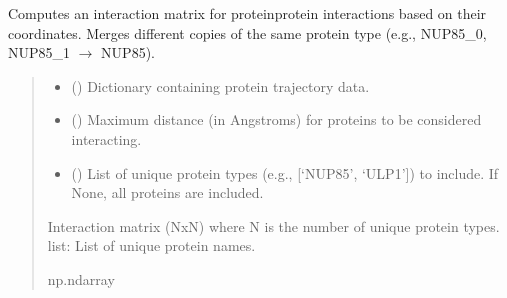 \documentclass[letterpaper,10pt,english]{sphinxmanual}
\begin{document}
\begin{fulllineitems}
\begin{fulllineitems}
\end{fulllineitems}


\begin{fulllineitems}
\label{\detokenize{src:src.Analysis_Class.Analysis.calculate_interaction_matrix}}
\pysigstartsignatures
{}
\pysigstopsignatures
\sphinxAtStartPar
Computes an interaction matrix for protein\sphinxhyphen{}protein interactions based on their coordinates.
Merges different copies of the same protein type (e.g., NUP85\_0, NUP85\_1 \(\rightarrow\) NUP85).
\begin{quote}\begin{description}
\begin{itemize}
\item {} 
\sphinxAtStartPar
{} () \textendash{} Dictionary containing protein trajectory data.

\item {} 
\sphinxAtStartPar
{} () \textendash{} Maximum distance (in Angstroms) for proteins to be considered interacting.

\item {} 
\sphinxAtStartPar
{} (\sphinxstyleliteralemphasis{\sphinxupquote{, }}) \textendash{} List of unique protein types (e.g., {[}‘NUP85’, ‘ULP1’{]}) to include.
If None, all proteins are included.

\end{itemize}

\sphinxAtStartPar
Interaction matrix (NxN) where N is the number of unique protein types.
list: List of unique protein names.

\sphinxAtStartPar
np.ndarray


\end{description}
\end{quote}
\end{fulllineitems}
\end{fulllineitems}
\end{document}

